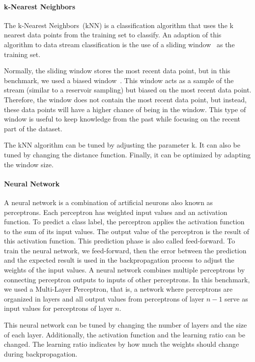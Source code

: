 \paragraph{k-Nearest Neighbors}
The k-Nearest Neighbors~(kNN) is a classification
algorithm that uses the k nearest data points from
the training set to classify.  An adaption of this
algorithm to data stream classification is the use
of a sliding window~\cite{Mining_Massive_Datasets}
as the training set.

Normally, the sliding window stores the most
recent data point, but in this benchmark, we used
a biased window~\cite{biased_reservoir_sampling}.
This window acts as a sample of
the stream (similar to a reservoir sampling) but
biased on the most recent data point.  Therefore,
the window does not contain the most recent data
point, but instead, these data points will have a
higher chance of being in the window.  This type
of window is useful to keep knowledge from the
past while focusing on the recent part of the
dataset.

The kNN algorithm can be tuned by adjusting the
parameter k. It can also be tuned by changing the
distance function. Finally, it can be optimized by
adapting the window size.

\paragraph{Neural Network}
A neural network is a combination of artificial
neurons also known as perceptrons. Each
perceptron has weighted input values and an
activation function. To predict a class label, the
perceptron applies the activation function to the sum
of its input values. The output
value of the perceptron is the result of this
activation function. This prediction phase is also
called feed-forward. To train the neural network,
we feed-forward, then the error between the
prediction and the expected result is used in the
backpropagation process to adjust the weights of
the input values.  A neural network combines
multiple perceptrons by connecting perceptron outputs
to inputs of other perceptrons.  In
this benchmark, we used a Multi-Layer Perceptron, 
that is, a network where perceptrons are organized in
layers and all output
values from perceptrons of layer $n-1$ serve as
input values for perceptrons of layer $n$. 

This neural network can be tuned by changing the
number of layers and the size of each layer.
Additionally, the activation function and the
learning ratio can be changed. The learning ratio
indicates by how much the weights should change
during backpropagation.

